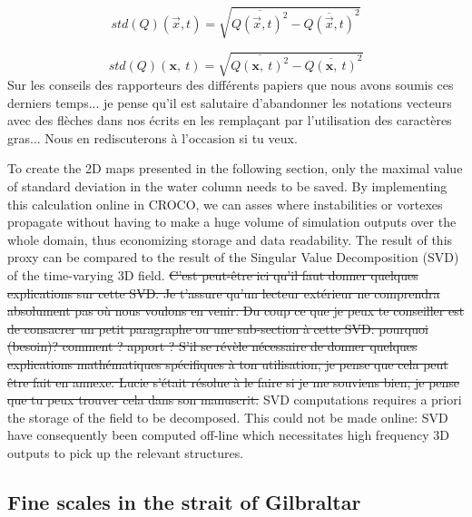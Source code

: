   \color{green}\begin{equation} 
\label{eqstdQ} 
    std ( Q ) (\vec{x},t)=  \sqrt{   \overline{Q (\vec{x},t)^{2}} -  \overline{Q(\vec{x},t)}^{2}  }
\end{equation}

 \color{blue}\begin{equation} 
\label{eqstdQ} 
    std ( Q ) (\mathbf{x},\ t)=  \sqrt{   \overline{Q (\mathbf{x},\ t)^{2}} -  \overline{Q(\mathbf{x},\ t)}^{2}  }
\end{equation}
 \color{green}Sur les conseils des rapporteurs des différents papiers que nous avons soumis ces derniers temps... je pense qu'il est salutaire d'abandonner les notations vecteurs avec des flèches dans nos écrits en les remplaçant par l'utilisation des caractères gras... Nous en rediscuterons à l'occasion si tu veux. \color{black}

To create the 2D maps presented in the following section, only the maximal value of standard deviation in the water column \color{blue}needs to be saved.
By implementing this calculation online in CROCO, we can asses where instabilities or vortexes propagate without having to make a huge volume of simulation outputs over the whole domain, thus economizing storage and data readability. \color{black}
The result of this proxy can be compared to the result of the Singular Value Decomposition (SVD) of the time-varying 3D field.  \sout{C'est peut-être ici qu'il faut donner quelques explications sur cette SVD. Je t'assure qu'un lecteur extérieur ne comprendra absolument pas où nous voulons en venir. Du coup ce que je peux te conseiller est de consacrer un petit paragraphe ou une sub-section à cette SVD: pourquoi (besoin)? comment ? apport ? S'il se révèle nécessaire de donner quelques explications mathématiques spécifiques à ton utilisation, je pense que cela peut être fait en annexe. Lucie s'était résolue à le faire si je me souviens bien, je pense que tu peux trouver cela dans son manuscrit.} \color{black}
 \color{blue}SVD computations requires a priori the storage of the field to be decomposed. This could not be made online: SVD have consequently been computed off-line which necessitates high frequency 3D outputs to pick up the relevant structures. \color{black}

\subsection{Fine scales in the strait of Gilbraltar}
\label{section3DRes}

